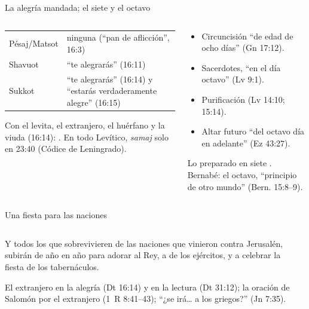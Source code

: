 \begin{frame}{La alegría mandada; el siete y el octavo}
\begin{columns}[t,onlytextwidth]
\begin{column}{0.49\textwidth}\small
{}\par\smallskip
\scriptsize
\renewcommand{\arraystretch}{1.12}
\begin{tabular}{@{}L{2.1cm}L{3.1cm}@{}}
\toprule
Pésaj/Matsot & ninguna (``pan de aflicción'', 16:3) \\
Shavuot & ``te alegrarás'' (16:11) \\
Sukkot & ``te alegrarás'' (16:14) y ``estarás verdaderamente alegre'' (16:15) \\
\bottomrule
\end{tabular}\par\smallskip
Con el levita, el extranjero, el huérfano y la viuda (16:14): . En todo Levítico, \emph{samaj} solo en 23:40 (Códice de Leningrado).
\end{column}
\begin{column}{0.49\textwidth}\small
{}\par\smallskip\scriptsize
\begin{itemize}
\item Circuncisión ``de edad de ocho días'' (Gn 17:12).
\item Sacerdotes, ``en el día octavo'' (Lv 9:1).
\item Purificación (Lv 14:10; 15:14).
\item Altar futuro ``del octavo día en adelante'' (Ez 43:27).
\end{itemize}
Lo preparado en siete . Bernabé: el octavo, ``principio de otro mundo'' (Bern. 15:8--9).
\end{column}
\end{columns}
\end{frame}

\begin{frame}{Una fiesta para las naciones}
\begin{columns}[c,onlytextwidth]
\begin{column}{0.57\textwidth}
\begin{cita}Y todos los que sobrevivieren de las naciones que vinieron contra Jerusalén, subirán de año en año para adorar al Rey, a \SENOR{} de los ejércitos, y a celebrar la fiesta de los tabernáculos.\end{cita}
\scriptsize El extranjero en la alegría (Dt 16:14) y en la lectura (Dt 31:12); la oración de Salomón por el extranjero (1~R 8:41--43); ``¿se irá\ldots{} a los griegos?'' (Jn 7:35).\par\smallskip
{}
\end{column}
\begin{column}{0.41\textwidth}\end{column}
\end{columns}
\end{frame}

